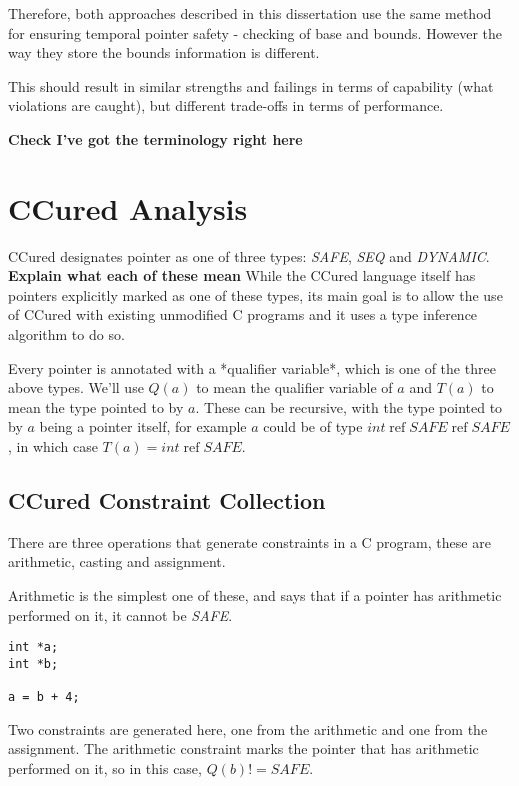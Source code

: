 Therefore, both approaches described in this dissertation use the same method for ensuring temporal pointer safety - checking of base and bounds.
However the way they store the bounds information is different.

This should result in similar strengths and failings in terms of capability (what violations are caught), but different trade-offs in terms of performance.


\textbf{Check I've got the terminology right here}

\section{CCured Analysis}

CCured designates pointer as one of three types: \textit{SAFE}, \textit{SEQ} and \textit{DYNAMIC}.
\textbf{Explain what each of these mean}
While the CCured language itself has pointers explicitly marked as one of these types, its main goal is to allow the use of CCured with existing unmodified C programs and it uses a type inference algorithm to do so.

Every pointer is annotated with a *qualifier variable*, which is one of the three above types.
We'll use $Q(a)$ to mean the qualifier variable of $a$ and $T(a)$ to mean the type pointed to by $a$.
These can be recursive, with the type pointed to by $a$ being a pointer itself, for example $a$ could be of type $int\; \mbox{ref}\; SAFE\; \mbox{ref}\; SAFE$, in which case $T(a) = int\;\mbox{ref}\;SAFE$.

\subsection{CCured Constraint Collection}

There are three operations that generate constraints in a C program, these are arithmetic, casting and assignment.

Arithmetic is the simplest one of these, and says that if a pointer has arithmetic performed on it, it cannot be \textit{SAFE}.

\begin{verbatim}
int *a;
int *b;

a = b + 4;
\end{verbatim}

Two constraints are generated here, one from the arithmetic and one from the assignment.
The arithmetic constraint marks the pointer that has arithmetic performed on it, so in this case, $Q(b) != SAFE$.

